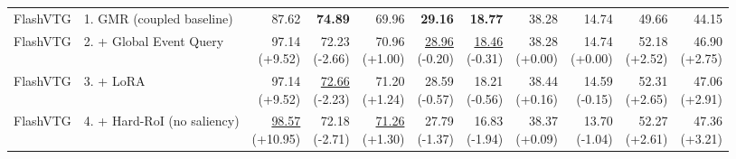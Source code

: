 \documentclass{article}
\begin{document}
{\begin{tabular}{llrrrrrrrrr}
\midrule
FlashVTG & 1. GMR (coupled baseline) & 87.62 & \textbf{74.89} & 69.96 & \textbf{29.16} & \textbf{18.77} & 38.28 & 14.74 & 49.66 & 44.15 \\
FlashVTG & 2. + Global Event Query & \shortstack{97.14 \\ {\scriptsize (+9.52)}} & \shortstack{72.23 \\ {\scriptsize (-2.66)}} & \shortstack{70.96 \\ {\scriptsize (+1.00)}} & \shortstack{\underline{28.96} \\ {\scriptsize (-0.20)}} & \shortstack{\underline{18.46} \\ {\scriptsize (-0.31)}} & \shortstack{38.28 \\ {\scriptsize (+0.00)}} & \shortstack{14.74 \\ {\scriptsize (+0.00)}} & \shortstack{52.18 \\ {\scriptsize (+2.52)}} & \shortstack{46.90 \\ {\scriptsize (+2.75)}} \\
FlashVTG & 3. + LoRA & \shortstack{97.14 \\ {\scriptsize (+9.52)}} & \shortstack{\underline{72.66} \\ {\scriptsize (-2.23)}} & \shortstack{71.20 \\ {\scriptsize (+1.24)}} & \shortstack{28.59 \\ {\scriptsize (-0.57)}} & \shortstack{18.21 \\ {\scriptsize (-0.56)}} & \shortstack{38.44 \\ {\scriptsize (+0.16)}} & \shortstack{14.59 \\ {\scriptsize (-0.15)}} & \shortstack{52.31 \\ {\scriptsize (+2.65)}} & \shortstack{47.06 \\ {\scriptsize (+2.91)}} \\
FlashVTG & 4. + Hard-RoI (no saliency) & \shortstack{\underline{98.57} \\ {\scriptsize (+10.95)}} & \shortstack{72.18 \\ {\scriptsize (-2.71)}} & \shortstack{\underline{71.26} \\ {\scriptsize (+1.30)}} & \shortstack{27.79 \\ {\scriptsize (-1.37)}} & \shortstack{16.83 \\ {\scriptsize (-1.94)}} & \shortstack{38.37 \\ {\scriptsize (+0.09)}} & \shortstack{13.70 \\ {\scriptsize (-1.04)}} & \shortstack{52.27 \\ {\scriptsize (+2.61)}} & \shortstack{47.36 \\ {\scriptsize (+3.21)}} \\

\end{tabular}}
\end{document}
